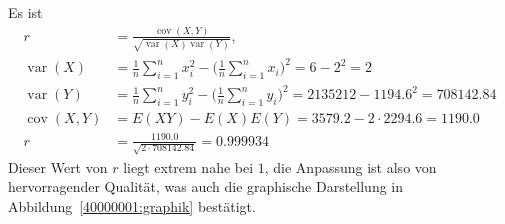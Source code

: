 \begin{loesung}
\begin{teilaufgaben}
Es ist
\begin{align*}
r
&=
\frac{\operatorname{cov}(X,Y)}{\sqrt{\operatorname{var}(X)\operatorname{var}(Y)}},
\\
\operatorname{var}(X)
&=
\frac1n\sum_{i=1}^nx_i^2-\biggl(\frac1n\sum_{i=1}^nx_i\biggr)^2
=
6-2^2=2
\\
\operatorname{var}(Y)
&=
\frac1n\sum_{i=1}^ny_i^2-\biggl(\frac1n\sum_{i=1}^ny_i\biggr)^2
=
2135212-1194.6^2=708142.84
\\
\operatorname{cov}(X,Y)
&=
E(XY)-E(X)E(Y)=3579.2-2\cdot 2294.6=1190.0
\\
r&=\frac{1190.0}{\sqrt{2\cdot 708142.84}}=0.999934
\end{align*}
Dieser Wert von $r$ liegt extrem nahe bei $1$, die Anpassung ist also von
hervorragender Qualität, was auch die graphische Darstellung
in Abbildung~\ref{40000001:graphik} bestätigt.
\qedhere
\end{teilaufgaben}
\end{loesung}
